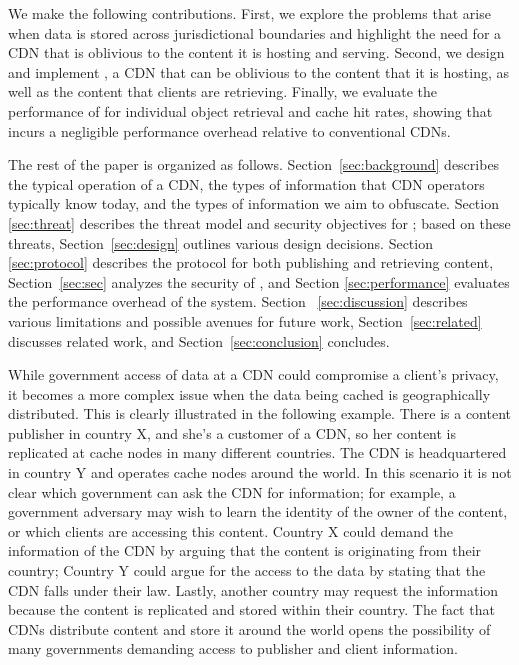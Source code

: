 We make the following contributions. First, we explore the problems that
arise when data is stored across jurisdictional boundaries and highlight the
need for a CDN that is oblivious to the content it is hosting and serving.
Second, we design and implement \system{}, a CDN that can be oblivious to the
content that it is hosting, as well as the content that clients are
retrieving. Finally, we evaluate the performance of \system{} for individual
object retrieval and cache hit rates, showing that \system{} incurs a negligible performance
overhead relative to conventional CDNs.

The rest of the paper is organized as follows. Section~\ref{sec:background} describes
the typical operation of a CDN, the types of information that CDN operators
typically know today, and the types of information we aim to obfuscate.  Section~
\ref{sec:threat} describes the threat model and security objectives for \system{}; based
on these threats, Section~\ref{sec:design} outlines various design decisions. Section~
\ref{sec:protocol} describes the protocol for both publishing and retrieving content,
Section~\ref{sec:sec} analyzes the security of \system{}, and Section \ref{sec:performance} 
evaluates the performance overhead of the system. Section~
\ref{sec:discussion} describes various limitations and possible avenues for future
work, Section~\ref{sec:related} discusses related work, and Section~\ref{sec:conclusion}
concludes.


While government access of data at a CDN could compromise a client's privacy,
it becomes a more complex issue when the data being cached is geographically
distributed. This is clearly illustrated in the following example.  There is a
content publisher in  country X, and she's a customer of a CDN, so her content
is replicated at cache nodes in many  different countries.  The CDN is
headquartered  in country Y and operates cache nodes around the world.  In
this scenario it is not clear which government can ask the CDN for
information; for  example, a government adversary may wish to learn the
identity of the owner of the content, or which clients are accessing  this
content.  Country X could demand the information of the CDN by arguing that
the content is originating  from their country; Country Y could argue for the
access to the data by stating that the CDN falls under their  law.  Lastly,
another country may request the information because the content is replicated
and stored within  their country.  The fact that CDNs distribute content and
store it around the world opens the possibility of  many governments demanding
access to publisher and client information.

